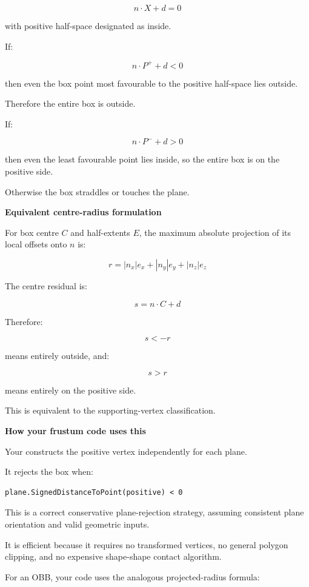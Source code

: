 \[
n\cdot X+d=0
\]

with positive half-space designated as inside.

If:

\[
n\cdot P^++d<0
\]

then even the box point most favourable to the positive half-space lies outside.

Therefore the entire box is outside.

If:

\[
n\cdot P^-+d>0
\]

then even the least favourable point lies inside, so the entire box is on the positive side.

Otherwise the box straddles or touches the plane.

\textbf{Equivalent centre-radius formulation}

For box centre \(C\) and half-extents \(E\), the maximum absolute projection of its local offsets onto \(n\) is:

\[
\boxed{ r=|n_x|e_x+|n_y|e_y+|n_z|e_z }
\]

The centre residual is:

\[
s=n\cdot C+d
\]

Therefore:

\[
s<-r
\]

means entirely outside, and:

\[
s>r
\]

means entirely on the positive side.

This is equivalent to the supporting-vertex classification.

\textbf{How your frustum code uses this}

Your  constructs the positive vertex independently for each plane.

It rejects the box when:

\begin{verbatim}
plane.SignedDistanceToPoint(positive) < 0
\end{verbatim}

This is a correct conservative plane-rejection strategy, assuming consistent plane orientation and valid geometric inputs.

It is efficient because it requires no transformed vertices, no general polygon clipping, and no expensive shape-shape contact algorithm.

For an OBB, your code uses the analogous projected-radius formula:

